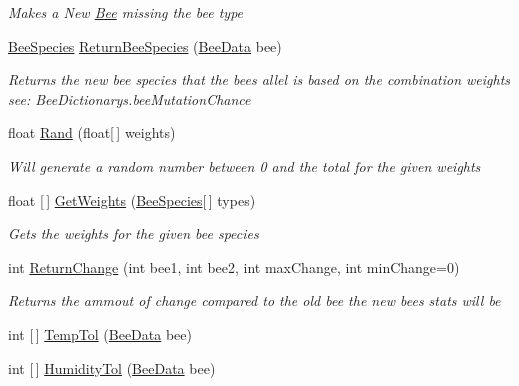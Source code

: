 \begin{DoxyCompactItemize}
\begin{DoxyCompactList}\small\item\em Makes a New \hyperlink{namespace_bee_game_1_1_bee}{Bee} missing the bee type \end{DoxyCompactList}\item 
\hyperlink{namespace_bee_game_1_1_enums_aa2ead984825678d83c42d48f6382619c}{Bee\+Species} \hyperlink{class_bee_game_1_1_bee_1_1_apiary_ae8d3e50eae58fd390e27203d76124f27}{Return\+Bee\+Species} (\hyperlink{struct_bee_game_1_1_bee_1_1_bee_data}{Bee\+Data} bee)
\begin{DoxyCompactList}\small\item\em Returns the new bee species that the bees allel is based on the combination weights see\+: Bee\+Dictionarys.\+bee\+Mutation\+Chance \end{DoxyCompactList}\item 
float \hyperlink{class_bee_game_1_1_bee_1_1_apiary_a1523391d65f498bd64df18f62840c2f0}{Rand} (float\mbox{[}$\,$\mbox{]} weights)
\begin{DoxyCompactList}\small\item\em Will generate a random number between 0 and the total for the given weights \end{DoxyCompactList}\item 
float \mbox{[}$\,$\mbox{]} \hyperlink{class_bee_game_1_1_bee_1_1_apiary_a0baa1876277fd0e541f0f6b2d347e69b}{Get\+Weights} (\hyperlink{namespace_bee_game_1_1_enums_aa2ead984825678d83c42d48f6382619c}{Bee\+Species}\mbox{[}$\,$\mbox{]} types)
\begin{DoxyCompactList}\small\item\em Gets the weights for the given bee species \end{DoxyCompactList}\item 
int \hyperlink{class_bee_game_1_1_bee_1_1_apiary_a2bdcdda97b0d7f0e4717aa2da979ee65}{Return\+Change} (int bee1, int bee2, int max\+Change, int min\+Change=0)
\begin{DoxyCompactList}\small\item\em Returns the ammout of change compared to the old bee the new bees stats will be \end{DoxyCompactList}\item 
int \mbox{[}$\,$\mbox{]} \hyperlink{class_bee_game_1_1_bee_1_1_apiary_a09fe0446372a57b69863b432e0fdee5e}{Temp\+Tol} (\hyperlink{struct_bee_game_1_1_bee_1_1_bee_data}{Bee\+Data} bee)
\item 
int \mbox{[}$\,$\mbox{]} \hyperlink{class_bee_game_1_1_bee_1_1_apiary_a066f8a76bdd01acbaed48e25768f36e4}{Humidity\+Tol} (\hyperlink{struct_bee_game_1_1_bee_1_1_bee_data}{Bee\+Data} bee)

\end{DoxyCompactItemize}
